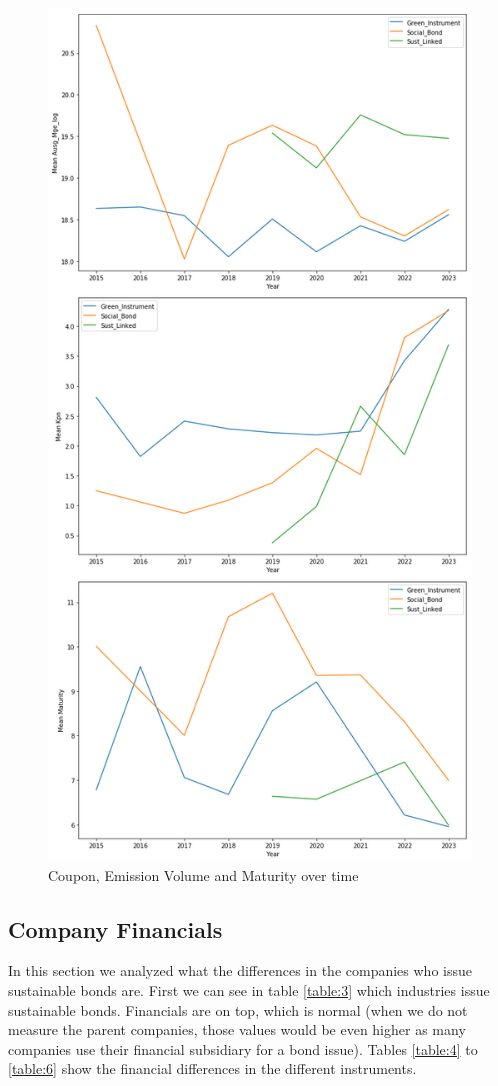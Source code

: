 \documentclass[12pt, a4paper]{article}
\begin{document}
\begin{figure}[H]
    \centering
    \includegraphics[width=0.8\linewidth, height=0.8\textheight, keepaspectratio]{Metrics_overtime.png}
    \caption{Coupon, Emission Volume and Maturity over time}
\label{fig:MetricsTime}
\end{figure}

\subsection{Company Financials}
In this section we analyzed what the differences in the companies who issue sustainable bonds are. First we can see in table \ref{table:3} which industries issue sustainable bonds. Financials are on top, which is normal (when we do not measure the parent companies, those values would be even higher as many companies use their financial subsidiary for a bond issue). Tables \ref{table:4} to \ref{table:6} show the financial differences in the different instruments.
\end{document}
